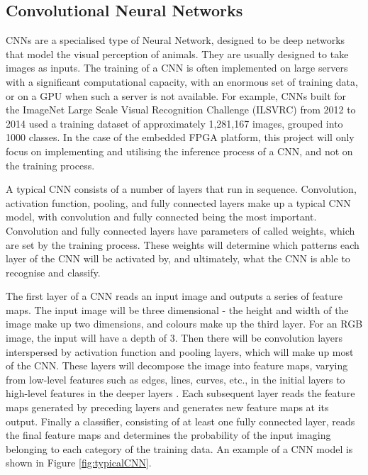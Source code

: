 \documentclass[12pt]{article}
\begin{document}
\subsection{Convolutional Neural Networks}
\label{sec:Background-CNN}

CNNs are a specialised type of Neural Network, designed to be deep networks that model the visual perception of animals. They are usually designed to take images as inputs. The training of a CNN is often implemented on large servers with a significant computational capacity, with an enormous set of training data, or on a GPU when such a server is not available. For example, CNNs built for the ImageNet Large Scale Visual Recognition Challenge (ILSVRC) from 2012 to 2014 used a training dataset of approximately 1,281,167  images, grouped into 1000 classes\cite{ILSVRC}. In the case of the embedded FPGA platform, this project will only focus on implementing and utilising the inference process of a CNN, and not on the training process.

A typical CNN consists of a number of layers that run in sequence. Convolution, activation function, pooling, and fully connected layers make up a typical CNN model, with convolution and fully connected being the most important. Convolution and fully connected layers have parameters of called weights, which are set by the training process. These weights will determine which patterns each layer of the CNN will be activated by, and ultimately, what the CNN is able to recognise and classify. 

The first layer of a CNN reads an input image and outputs a series of feature maps. The input image will be three dimensional - the height and width of the image make up two dimensions, and colours make up the third layer. For an RGB image, the input will have a depth of 3. Then there will be convolution layers interspersed by activation function and pooling layers, which will make up most of the CNN. These layers will decompose the image into feature maps, varying from low-level features such as edges, lines, curves, etc., in the initial layers to high-level features in the deeper layers \cite{SudaFpgaAccelerator}. Each subsequent layer reads the feature maps generated by preceding layers and generates new feature maps at its output. Finally a classifier, consisting of at least one fully connected layer, reads the final feature maps and determines the probability of the input imaging belonging to each category of the training data. An example of a CNN model is shown in Figure \ref{fig:typicalCNN}.
\end{document}
